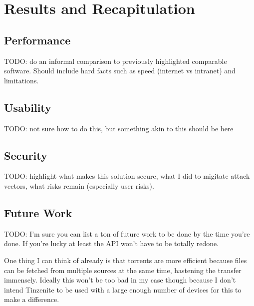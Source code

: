 \chapter{Results and Recapitulation}
\label{chap:results}


\section{Performance}

TODO: do an informal comparison to previously highlighted comparable software.
Should include hard facts such as speed (internet vs intranet) and limitations.

\section{Usability}

TODO: not sure how to do this, but something akin to this should be here

\section{Security}

TODO: highlight what makes this solution secure, what I did to migitate attack vectors, what risks remain (especially user risks).

\section{Future Work}

TODO: I'm sure you can list a ton of future work to be done by the time you're done.
If you're lucky at least the API won't have to be totally redone.

One thing I can think of already is that torrents are more efficient because files can be fetched from multiple sources at the same time, hastening the transfer immensely.
Ideally this won't be too bad in my case though because I don't intend Tinzenite to be used with a large enough number of devices for this to make a difference.
